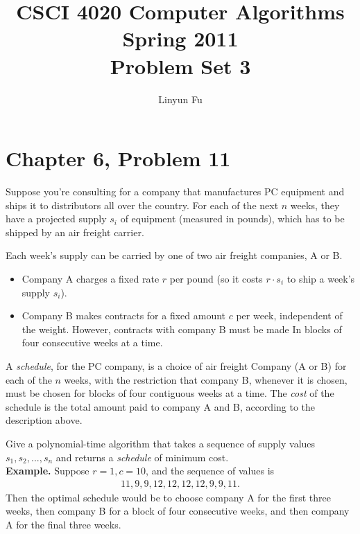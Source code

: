 \documentclass[12pt,letterpaper]{article}
\author{Linyun Fu}
\title{CSCI 4020 Computer Algorithms Spring 2011\\
Problem Set 3}
\begin{document}
\maketitle
\section*{Chapter 6, Problem 11}
Suppose you're consulting for a company that manufactures PC equipment
and ships it to distributors all over the country. For each of the
next $n$ weeks, they have a projected supply $s_i$ of equipment (measured in
pounds), which has to be shipped by an air freight carrier.

Each week's supply can be carried by one of two air freight companies,
A or B.
\begin{itemize}
\item Company A charges a fixed rate $r$ per pound (so it costs $r\cdot s_i$ to ship
a week's supply $s_i$).
\item Company B makes contracts for a fixed amount $c$ per week, independent
of the weight. However, contracts with company B must be made
In blocks of four consecutive weeks at a time.
\end{itemize}

A \emph{schedule}, for the PC company, is a choice of air freight Company
(A or B) for each of the $n$ weeks, with the restriction that company B,
whenever it is chosen, must be chosen for blocks of four contiguous
weeks at a time. The \emph{cost} of the schedule is the total amount paid to
company A and B, according to the description above.

Give a polynomial-time algorithm that takes a sequence of supply values
$s_1, s_2, ..., s_n$ and returns a \emph{schedule} of minimum cost.\\
\textbf{Example.} Suppose $r = 1, c = 10$, and the sequence of values is
\begin{align*}
11, 9, 9, 12, 12, 12, 12, 9, 9, 11.
\end{align*}
Then the optimal schedule would be to choose company A for the first
three weeks, then company B for a block of four consecutive weeks, and
then company A for the final three weeks.
\end{document}
